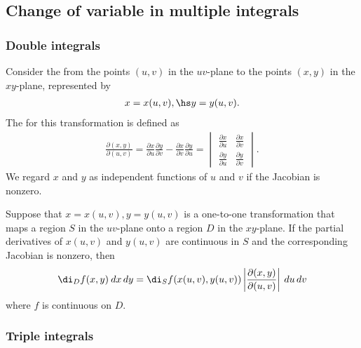 \documentclass{article}
\begin{document}
\subsection{Change of variable in multiple integrals}


\subsubsection{Double integrals}

\begin{definition}
    Consider the  from the points $(u,v)$ in the $uv$-plane to the points $(x,y)$
    in the $xy$-plane, represented by
    \begin{align*}
        x = x(u,v),\hs y=y(u,v).
    \end{align*}
    The  for this transformation is defined as
    \begin{align*}
        \frac{\partial(x,y)}{\partial(u,v)}
        =\frac{\partial x}{\partial u}\frac{\partial y}{\partial v}
        - \frac{\partial x}{\partial v}\frac{\partial y}{\partial u}
        =\begin{vmatrix}
            \frac{\partial x}{\partial u} &\frac{\partial x}{\partial v}\\
            \frac{\partial y}{\partial u} &\frac{\partial y}{\partial v}
        \end{vmatrix}.
    \end{align*}
    We regard $x$ and $y$ as independent functions of $u$ and $v$ if the Jacobian is nonzero.
\end{definition}
\begin{theorem}
    Suppose that $x=x(u,v), y=y(u,v)$ is a one-to-one transformation that maps a region
    $S$ in the $uv$-plane onto a region $D$ in the $xy$-plane. If the partial derivatives
    of $x(u,v)$ and $y(u,v)$ are continuous in $S$ and the corresponding Jacobian is nonzero,
    then
    \begin{align*}
        \di_D f(x,y)\:dx\,dy = \di_S f(x(u,v), y(u,v))\left|\frac{\partial(x,y)}{\partial(u,v)}\right|\:du\,dv
    \end{align*}
    where $f$ is continuous on $D$.
\end{theorem}

\subsubsection{Triple integrals}
\end{document}

